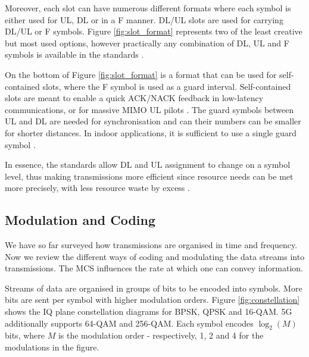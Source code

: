 
Moreover, each slot can have numerous different formats where each symbol is either used for UL, DL or in a \ac{F} manner. \ac{DL}/\ac{UL} slots are used for carrying \ac{DL}/\ac{UL} or \ac{F} symbols. Figure \ref{fig:slot_format} represents two of the least creative but most used options, however practically any combination of DL, UL and F symbols is available in the standards \cite{3gpp_slot_periodicity}. 


On the bottom of Figure \ref{fig:slot_format} is a format that can be used for self-contained slots, where the F symbol is used as a guard interval. Self-contained slots are meant to enable a quick ACK/NACK feedback in low-latency communications, or for massive MIMO UL pilots \cite{qualcomm_innovative_five}. The guard symbols between UL and DL are needed for synchronisation and can their numbers can be smaller for shorter distances. In indoor applications, it is sufficient to use a single guard symbol \cite{rel15_self_contained_slot_qualcomm}.

In essence, the standards allow DL and UL assignment to change on a symbol level, thus making transmissions more efficient since resource needs can be met more precisely, with less resource waste by excess \cite{air_interface_system_principles}.


\subsection*{Modulation and Coding}

We have so far surveyed how transmissions are organised in time and frequency. Now we review the different ways of coding and modulating the data streams into transmissions. The \ac{MCS} influences the rate at which one can convey information.

Streams of data are organised in groups of bits to be encoded into symbols. More bits are sent per symbol with higher modulation orders. Figure \ref{fig:constellation} shows the \ac{IQ} plane constellation diagrams for \ac{BPSK}, \ac{QPSK} and 16-\ac{QAM}. 5G additionally supports 64-QAM and 256-QAM. Each symbol encodes $\log_2(M)$ bits, where $M$ is the modulation order - respectively, 1, 2 and 4 for the modulations in the figure.

